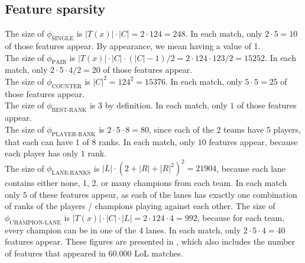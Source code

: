 \subsection{Feature sparsity}\label{sec:featuresparsity}
The size of $\phi_{\text{SINGLE}}$ is $|T(x)| \cdot |C| = 2 \cdot 124 = 248$. In each match, only $2 \cdot 5 = 10$ of those features appear. By appearance, we mean having a value of 1.\\
The size of $\phi_{\text{PAIR}}$ is $|T(x)| \cdot |C| \cdot (|C|-1) / 2 = 2 \cdot 124 \cdot 123 / 2 = 15252$. In each match, only $2 \cdot 5 \cdot 4 / 2 = 20$ of those features appear.\\
The size of $\phi_{\text{COUNTER}}$ is $|C|^2 = 124^2 = 15376$. In each match, only $5 \cdot 5 = 25$ of those features appear.\\
The size of $\phi_{\text{BEST-RANK}}$ is 3 by definition. In each match, only $1$ of those features appear.\\
The size of $\phi_{\text{PLAYER-RANK}}$ is $2 \cdot 5 \cdot 8 = 80$, since each of the $2$ teams have $5$ players, that each can have $1$ of $8$ ranks. In each match, only $10$ features appear, because each player has only $1$ rank.\\
The size of $\phi_{\text{LANE-RANKS}}$ is $|L| \cdot (2 + |R| + |R|^2)^2 = 21904$, because each lane contains either none, 1, 2, or many champions from each team.
In each match only $5$ of these features appear, as each of the lanes has exactly one combination of ranks of the players / champions playing against each other.
The size of $\phi_{\text{CHAMPION-LANE}}$ is $|T(x)| \cdot |C| \cdot |L| = 2 \cdot 124 \cdot 4 = 992$, because for each team, every champion can be in one of the 4 lanes. In each match, only $2 \cdot 5 \cdot 4 = 40$ features appear. 
These figures are presented in , which also includes the number of features that appeared in $60.000$ LoL matches.

